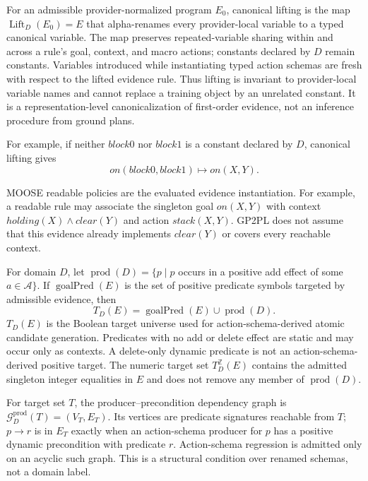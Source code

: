 \begin{definition}
For an admissible provider-normalized program $E_0$, canonical lifting is the
map $\operatorname{Lift}_D(E_0)=E$ that alpha-renames every provider-local
variable to a typed canonical variable. The map preserves repeated-variable sharing
within and across a rule's goal, context, and macro actions; constants declared
by $D$ remain constants. Variables introduced while instantiating typed action
schemas are fresh with respect to the lifted evidence rule. Thus lifting is
invariant to provider-local variable names and cannot replace a training object
by an unrelated constant. It is a representation-level canonicalization of
first-order evidence, not an inference procedure from ground plans.
\end{definition}

For example, if neither $\mathit{block0}$ nor $\mathit{block1}$ is a constant
declared by $D$, canonical lifting gives
\[
\mathit{on}(\mathit{block0},\mathit{block1})\mapsto\mathit{on}(X,Y).
\]

MOOSE readable policies \cite{Chen2026Moose} are the evaluated evidence
instantiation. For example,
a readable rule may associate the singleton goal $on(X,Y)$ with context
$holding(X)\land clear(Y)$ and action $stack(X,Y)$. GP2PL does not assume that
this evidence already implements $clear(Y)$ or covers every reachable context.

\begin{definition}
For domain $D$, let
$\operatorname{prod}(D)=\{p\mid p$ occurs in a positive add effect of some
$a\in\mathcal A\}$. If $\operatorname{goalPred}(E)$ is the set of positive
predicate symbols targeted by admissible evidence, then
\[
T_D(E)=\operatorname{goalPred}(E)\cup\operatorname{prod}(D).
\]
$T_D(E)$ is the Boolean target universe used for action-schema-derived atomic
candidate generation. Predicates with no add or delete effect are static and may
occur only as contexts. A delete-only dynamic predicate is not an
action-schema-derived
positive target. The numeric target set
$T_D^{\mathbb Z}(E)$ contains the admitted singleton integer equalities in $E$
and does not remove any member of $\operatorname{prod}(D)$.
\end{definition}

For target set $T$, the producer--precondition dependency graph is
$\mathcal G_D^{\mathrm{prod}}(T)=(V_T,E_T)$. Its vertices are predicate
signatures reachable from $T$; $p\rightarrow r$ is in $E_T$ exactly when an
action-schema producer for $p$ has a positive dynamic precondition with
predicate $r$. Action-schema regression is admitted only on an acyclic such
graph. This is a structural condition over renamed schemas, not a domain label.

